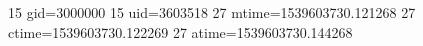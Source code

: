 15 gid=3000000
15 uid=3603518
27 mtime=1539603730.121268
27 ctime=1539603730.122269
27 atime=1539603730.144268
